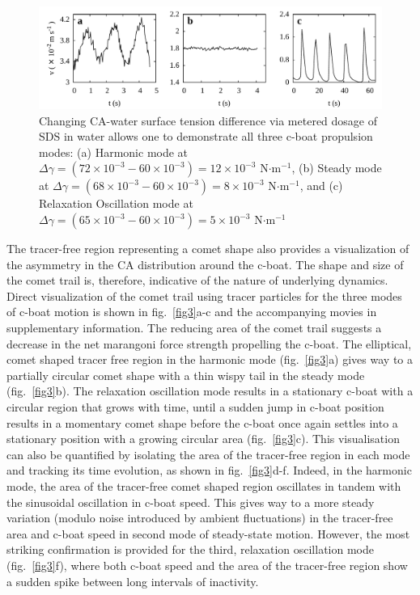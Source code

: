 \documentclass[journal=langd5, manuscript=article, layout=twocolumn]{achemso}
\begin{document}
\begin{figure}[ht] 
    \centering
       \includegraphics[width=\textwidth]{figure4_v2.pdf}
    \caption{Changing CA-water surface tension difference via metered dosage of SDS in water allows one to demonstrate all three c-boat propulsion modes: (a) Harmonic mode at $\Delta \gamma =  (72\times 10^{-3} - 60\times 10^{-3}) = 12\times 10^{-3}$ N$\cdot$m$^{-1}$, (b) Steady mode at $\Delta \gamma =  (68\times 10^{-3} - 60\times 10^{-3}) = 8\times 10^{-3}$ N$\cdot$m$^{-1}$, and (c) Relaxation Oscillation mode at $\Delta \gamma =  (65\times 10^{-3} - 60\times 10^{-3}) = 5\times 10^{-3}$ N$\cdot$m$^{-1}$}
    \label{fig4}
\end{figure}

The tracer-free region representing a comet shape also provides a visualization of the asymmetry in the CA distribution around the c-boat. The shape and size of the comet trail is, therefore, indicative of the nature of underlying dynamics. Direct visualization of the comet trail using tracer particles for the three modes of c-boat motion is shown in fig.~\ref{fig3}a-c and the accompanying movies in supplementary information. The reducing area of the comet trail suggests a decrease in the net marangoni force strength propelling the c-boat. The elliptical, comet shaped tracer free region in the harmonic mode (fig.~\ref{fig3}a) gives way to a partially circular comet shape with a thin wispy tail in the steady mode (fig.~\ref{fig3}b). The relaxation oscillation mode results in a stationary c-boat with a circular region that grows with time, until a sudden jump in c-boat position results in a momentary comet shape before the c-boat once again settles into a stationary position with a growing circular area (fig.~\ref{fig3}c). This visualisation can also be quantified by isolating the area of the tracer-free region in each mode and tracking its time evolution, as shown in fig.~\ref{fig3}d-f. Indeed, in the harmonic mode, the area of the tracer-free comet shaped region oscillates in tandem with the sinusoidal oscillation in c-boat speed. This gives way to a more steady variation (modulo noise introduced by ambient fluctuations) in the tracer-free area and c-boat speed in second mode of steady-state motion. However, the most striking confirmation is provided for the third, relaxation oscillation mode (fig.~\ref{fig3}f), where both c-boat speed and the area of the tracer-free region show a sudden spike between long intervals of inactivity.
\end{document}
